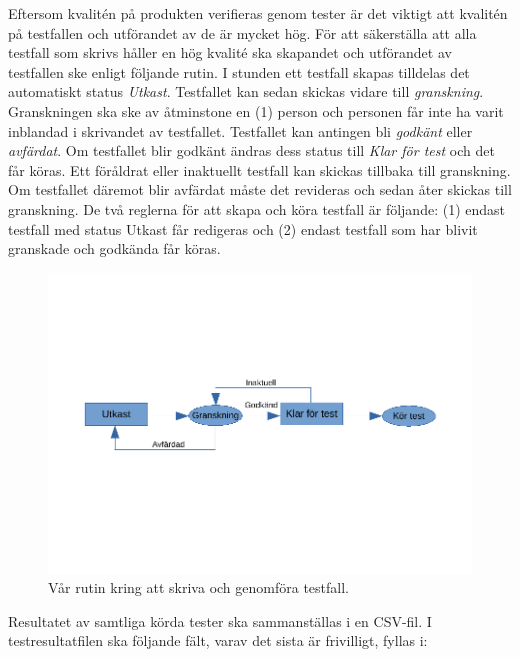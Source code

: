 \documentclass[a4paper]{article}
\begin{document}
Eftersom kvalitén på produkten verifieras genom tester är det viktigt att kvalitén på testfallen och utförandet av de är mycket hög. För att säkerställa att alla testfall som skrivs håller en hög kvalité ska skapandet och utförandet av testfallen ske enligt följande rutin.
I stunden ett testfall skapas tilldelas det automatiskt status \textit{Utkast}. Testfallet kan sedan skickas vidare till \textit{granskning}. Granskningen ska ske av åtminstone en (1) person och personen får inte ha varit inblandad i skrivandet av testfallet. Testfallet kan antingen bli \textit{godkänt} eller \textit{avfärdat}. Om testfallet blir godkänt ändras dess status till \textit{Klar för test} och det får köras. Ett föråldrat eller inaktuellt testfall kan skickas tillbaka till granskning. Om testfallet däremot blir avfärdat måste det revideras och sedan åter skickas till granskning. De två reglerna för att skapa och köra testfall är följande: (1) endast testfall med status Utkast får redigeras och (2) endast testfall som har blivit granskade och godkända får köras.

\begin{figure}[h]
  \centering
  \includegraphics[trim={0 4cm 0 3cm}, clip, scale=0.8]{figurer/testrutin.pdf}
  \caption{Vår rutin kring att skriva och genomföra testfall.}
\end{figure}

Resultatet av samtliga körda tester ska sammanställas i en CSV-fil. I testresultatfilen ska följande fält, varav det sista är frivilligt, fyllas i:
\end{document}
